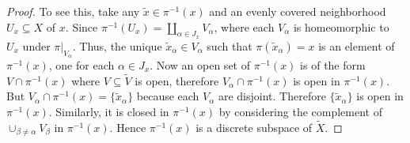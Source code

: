 \documentclass[letterpaper,11pt,twoside]{article}
\theoremstyle{definition}
\theoremstyle{definition}
\theoremstyle{definition}
\theoremstyle{definition}
\theoremstyle{definition}
\theoremstyle{definition}
\theoremstyle{remark}
\theoremstyle{definition}
\newcommand{\rest}[2]{\left. { #1 }\right \vert_{#2}}
\newcommand{\union}[0]{\cup}
\begin{document}
\begin{proof}
To see this, take any $\tilde{x}\in \pi^{-1}(x)$ and an evenly covered neighborhood $U_x \subseteq X$ of $x$. Since $\pi^{-1}(U_x) = \coprod_{\alpha \in J_x} V_\alpha$, where each $V_\alpha$ is homeomorphic to $U_x$ under $\rest{\pi}{V_\alpha}$. Thus, the unique ${\tilde x}_\alpha \in V_\alpha $ such that $\pi({\tilde x}_\alpha) = x$ is an element of $\pi^{-1}(x)$, one for each $\alpha \in J_x$. Now an open set of $\pi^{-1}(x)$ is of the form $V \cap \pi^{-1}(x)$ where $V\subseteq \tilde V$ is open, therefore $V_\alpha \cap \pi^{-1}(x)$ is open in $\pi^{-1}(x)$. But $V_\alpha \cap \pi^{-1}(x) = \{{\tilde x}_\alpha\}$ because each $V_\alpha$ are disjoint. Therefore $\{{\tilde x}_\alpha\}$ is open in $\pi^{-1}(x)$. Similarly, it is closed in $\pi^{-1}(x)$ by considering the complement of $\union_{\beta\neq \alpha} V_\beta$ in $\pi^{-1}(x)$. Hence $\pi^{-1}(x)$ is a discrete subspace of $\tilde{X}$.
\end{proof}
\end{document}
